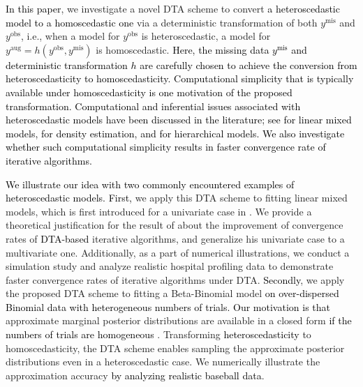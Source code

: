 \documentclass[12pt]{article}
\begin{document}




\textcolor{black}{In this paper}, we investigate a novel DTA scheme to convert \textcolor{black}{a heteroscedastic model to a homoscedastic one} via a deterministic transformation of both $y^{\textrm{mis}}$ and $y^{\textrm{obs}}$, i.e., when a model for $y^{\textrm{obs}}$ is heteroscedastic, a model for $y^{\textrm{aug}}=h(y^{\textrm{obs}},  y^{\textrm{mis}})$ is homoscedastic. \textcolor{black}{Here, the missing data $y^{\textrm{mis}}$ and deterministic transformation $h$ are carefully chosen to achieve the conversion from heteroscedasticity to homoscedasticity.  Computational simplicity that is typically available under homoscedasticity is one motivation of the proposed transformation. Computational and inferential issues associated with heteroscedastic models have been discussed in the literature; see \cite{everson2000inference} for linear mixed models, \cite{staudenmayer2008density} for density estimation, and \cite{xianchao2012sure} for hierarchical models. We also investigate whether such computational simplicity results in faster convergence rate of iterative algorithms.}  


\textcolor{black}{We illustrate our idea with two commonly encountered examples of heteroscedastic models. First,} we apply this DTA scheme to fitting linear mixed models, which is first introduced for a univariate case in \cite{kelly2014advances}. We provide a theoretical justification for the result of \cite{kelly2014advances} about the improvement of convergence rates of \textcolor{black}{DTA-based} iterative algorithms, and generalize his univariate case to a multivariate one.  Additionally, as a part of numerical illustrations, we conduct  a simulation study and analyze realistic hospital profiling data to demonstrate faster convergence rates of iterative algorithms under DTA. \textcolor{black}{Secondly}, we apply the proposed DTA scheme to fitting a Beta-Binomial model \textcolor{black}{on over-dispersed Binomial data with heterogeneous numbers of trials. Our motivation is that} approximate marginal posterior distributions are available in a closed form \textcolor{black}{if the numbers of trials are homogeneous}  \citep{everson2002betabin}. Transforming \textcolor{black}{heteroscedasticity} to homoscedasticity, the DTA scheme enables sampling the approximate  posterior distributions even in a heteroscedastic case. We numerically illustrate the approximation accuracy  \textcolor{black}{by analyzing realistic baseball data}.  
\end{document}
